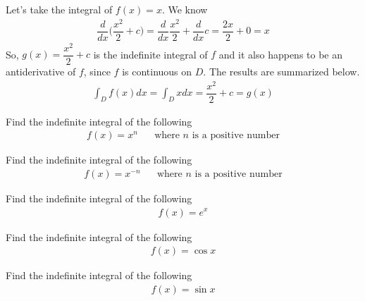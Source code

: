 \begin{example}
Let's take the integral of $f(x) = x$. We know 
\begin{align*}
    \dfrac{d}{dx} \Big(\dfrac{x^{2}}{2} + c \Big) = \dfrac{d}{dx} \dfrac{x^{2}}{2} + \dfrac{d}{dx} c = \dfrac{2x}{2} + 0 = x
\end{align*}
So, $g(x) = \dfrac{x^{2}}{2} + c$ is the indefinite integral of $f$ and it also happens to be an antiderivative of $f$, since $f$ is continuous on $D$. The results are summarized below.
\begin{align*}
    \int_{D} f(x)dx = \int_{D} x dx  =  \dfrac{x^{2}}{2} + c = g(x)
\end{align*}
\end{example}

\begin{exercise}
Find the indefinite integral of the following
\begin{align*}
    f(x) = x^{n} \hspace{20pt} \text{where $n$ is a positive number} 
\end{align*}
\end{exercise}

\begin{exercise}
Find the indefinite integral of the following
\begin{align*}
    f(x) = x^{-n} \hspace{20pt} \text{where $n$ is a positive number}
\end{align*}
\end{exercise}

\begin{exercise}
Find the indefinite integral of the following
\begin{align*}
    f(x) = e^{x}
\end{align*}
\end{exercise}

\begin{exercise}
Find the indefinite integral of the following
\begin{align*}
    f(x) = \cos x
\end{align*}
\end{exercise}

\begin{exercise}
Find the indefinite integral of the following
\begin{align*}
    f(x) = \sin x
\end{align*}
\end{exercise}

